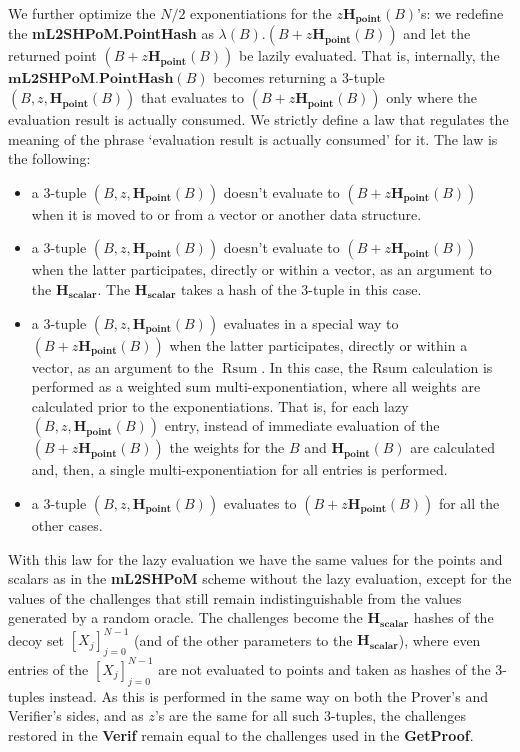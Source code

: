 \documentclass{mathcryptology} %
\DeclareMathOperator{\Rsum}{Rsum}
\newcommand{\Hpoint}{\textbf{H}_{\textbf{point}}}
\newcommand{\Hscalar}{\textbf{H}_{\textbf{scalar}}}
\theoremstyle{title}
\theoremstyle{titleof}
\begin{document}
    We further optimize the $N/2$ exponentiations for the $z\Hpoint\left(B\right)$'s: we redefine the \textbf{mL2SHPoM.PointHash} as $\lambda\left(B\right).\left(B+z\Hpoint\left(B\right)\right)$ and let the returned point $\left(B+z\Hpoint\left(B\right)\right)$ be lazily evaluated.
    That is, internally, the $\textbf{mL2SHPoM.PointHash}\left(B\right)$ becomes returning a 3-tuple $\left(B, z, \Hpoint\left(B\right)\right)$ that evaluates to $\left(B+z\Hpoint\left(B\right)\right)$ only where the evaluation result is actually consumed. We strictly define a law that regulates the meaning of the phrase `evaluation result is actually consumed' for it. The law is the following:
    \begin{itemize}
        \item a 3-tuple $\left(B, z, \Hpoint\left(B\right)\right)$ doesn't evaluate to $\left(B+z\Hpoint\left(B\right)\right)$ when it is moved to or from a vector or another data structure.
        \item a 3-tuple $\left(B, z, \Hpoint\left(B\right)\right)$ doesn't evaluate to $\left(B+z\Hpoint\left(B\right)\right)$ when the latter participates, directly or within a vector, as an argument to the $\Hscalar$. The $\Hscalar$ takes a hash of the 3-tuple in this case.
        \item a 3-tuple $\left(B, z, \Hpoint\left(B\right)\right)$ evaluates in a special way to $\left(B+z\Hpoint\left(B\right)\right)$ when the latter participates, directly or within a vector, as an argument to the $\Rsum$. In this case, the Rsum calculation is performed as a weighted sum multi-exponentiation, where all weights are calculated prior to the exponentiations. That is, for each lazy $\left(B, z, \Hpoint\left(B\right)\right)$ entry, instead of immediate evaluation of the $\left(B+z\Hpoint\left(B\right)\right)$ the weights for the $B$ and $\Hpoint\left(B\right)$ are calculated and, then, a single multi-exponentiation for all entries is performed.
        \item a 3-tuple $\left(B, z, \Hpoint\left(B\right)\right)$ evaluates to $\left(B+z\Hpoint\left(B\right)\right)$ for all the other cases.
    \end{itemize}
    With this law for the lazy evaluation we have the same values for the points and scalars as in the \textbf{mL2SHPoM} scheme without the lazy evaluation, except for the values of the challenges that still remain indistinguishable from the values generated by a random oracle.
    The challenges become the $\Hscalar$ hashes of the decoy set ${\left[X_{j}\right]}_{j=0}^{N-1}$ (and of the other parameters to the $\Hscalar$), where even entries of the ${\left[X_{j}\right]}_{j=0}^{N-1}$ are not evaluated to points and taken as hashes of the 3-tuples instead. As this is performed in the same way on both the Prover's and Verifier's sides, and as $z$'s are the same for all such 3-tuples, the challenges restored in the \textbf{Verif}
    remain equal to the challenges used in the \textbf{GetProof}.
\end{document}
